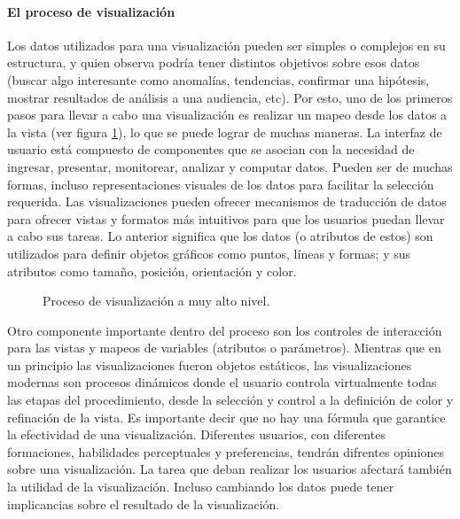\documentclass[12pt]{article}
\begin{document}
\paragraph{El proceso de visualización}

Los datos utilizados para una visualización pueden ser simples o complejos en su estructura, y quien observa podría tener distintos objetivos sobre esos datos (buscar algo interesante como anomalías, tendencias, confirmar una hipótesis, mostrar resultados de análisis a una audiencia, etc). Por esto, uno de los primeros pasos para llevar a cabo una visualización es realizar un mapeo desde los datos a la vista (ver figura \ref{fig:proc_visualizacion}), lo que se puede lograr de muchas maneras. La interfaz de usuario está compuesto de componentes que se asocian con la necesidad de ingresar, presentar, monitorear, analizar y computar datos. Pueden ser de muchas formas, incluso representaciones visuales de los datos para facilitar la selección requerida. Las visualizaciones pueden ofrecer mecanismos de traducción de datos para ofrecer vistas  y formatos más intuitivos para que los usuarios puedan llevar a cabo sus tareas. Lo anterior significa que los datos (o atributos de estos) son utilizados para definir objetos gráficos como puntos, líneas y formas; y sus atributos como tamaño, posición, orientación y color.

\begin{figure}[h] %
\caption{Proceso de visualización a muy alto nivel. }
\label{fig:proc_visualizacion}
\end{figure}


Otro componente importante dentro del proceso son los controles de interacción para las vistas y mapeos de variables (atributos o parámetros). Mientras que en un principio las visualizaciones fueron objetos estáticos, las visualizaciones modernas son procesos dinámicos donde el usuario controla virtualmente todas las etapas  del procedimiento, desde la selección y control a la definición de color y refinación de la vista. Es importante decir que no hay una fórmula que garantice la efectividad de una visualización. Diferentes usuarios, con diferentes formaciones, habilidades perceptuales y preferencias, tendrán difrentes opiniones sobre una visualización. La tarea que deban realizar los usuarios afectará también la utilidad de la visualización. Incluso cambiando los datos puede tener implicancias sobre el resultado de la visualización.
\end{document}
